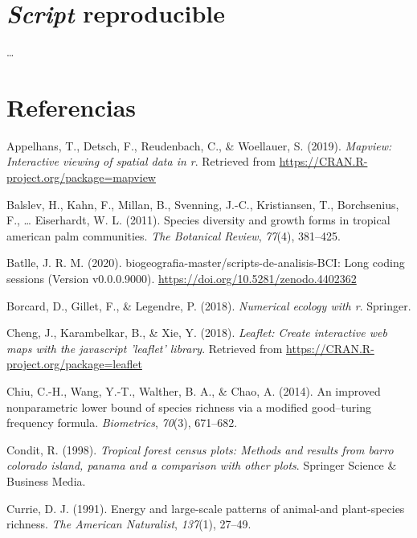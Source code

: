 \documentclass[11pt,]{article}
\begin{document}
\section{\texorpdfstring{\emph{Script}
reproducible}{Script reproducible}}\label{script-reproducible}

\ldots

\section*{Referencias}\label{referencias}

\hypertarget{refs}{}
\hypertarget{ref-MapView}{}
Appelhans, T., Detsch, F., Reudenbach, C., \& Woellauer, S. (2019).
\emph{Mapview: Interactive viewing of spatial data in r}. Retrieved from
\url{https://CRAN.R-project.org/package=mapview}

\hypertarget{ref-balslev2011species}{}
Balslev, H., Kahn, F., Millan, B., Svenning, J.-C., Kristiansen, T.,
Borchsenius, F., \ldots{} Eiserhardt, W. L. (2011). Species diversity
and growth forms in tropical american palm communities. \emph{The
Botanical Review}, \emph{77}(4), 381--425.

\hypertarget{ref-jose_ramon_martinez_batlle_2020_4402362}{}
Batlle, J. R. M. (2020). biogeografia-master/scripts-de-analisis-BCI:
Long coding sessions (Version v0.0.0.9000).
\url{https://doi.org/10.5281/zenodo.4402362}

\hypertarget{ref-borcard2018numerical}{}
Borcard, D., Gillet, F., \& Legendre, P. (2018). \emph{Numerical ecology
with r}. Springer.

\hypertarget{ref-Leaflet}{}
Cheng, J., Karambelkar, B., \& Xie, Y. (2018). \emph{Leaflet: Create
interactive web maps with the javascript 'leaflet' library}. Retrieved
from \url{https://CRAN.R-project.org/package=leaflet}

\hypertarget{ref-chiu2014improved}{}
Chiu, C.-H., Wang, Y.-T., Walther, B. A., \& Chao, A. (2014). An
improved nonparametric lower bound of species richness via a modified
good--turing frequency formula. \emph{Biometrics}, \emph{70}(3),
671--682.

\hypertarget{ref-condit1998tropical}{}
Condit, R. (1998). \emph{Tropical forest census plots: Methods and
results from barro colorado island, panama and a comparison with other
plots}. Springer Science \& Business Media.

\hypertarget{ref-currie1991energy}{}
Currie, D. J. (1991). Energy and large-scale patterns of animal-and
plant-species richness. \emph{The American Naturalist}, \emph{137}(1),
27--49.
\end{document}
